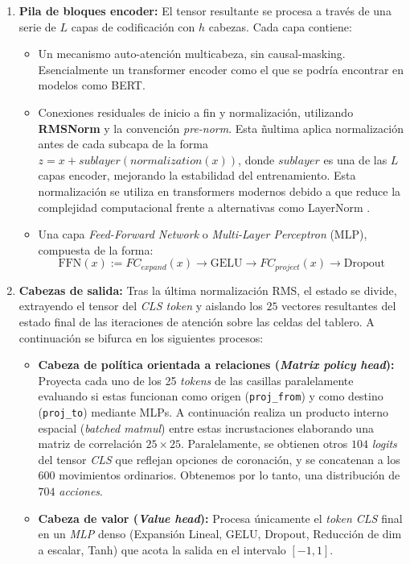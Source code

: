\documentclass[12pt, a4paper]{article}
\let\cite\supercite
\begin{document}
\begin{enumerate}
    \item \textbf{Pila de bloques encoder:} El tensor resultante se procesa a través de una serie de $L$ capas de codificación con $h$ cabezas. Cada capa contiene:
    \begin{itemize}
        \item Un mecanismo auto-atención multicabeza, sin causal-masking. Esencialmente un transformer encoder como el que se podría encontrar en modelos como BERT.
        
        \item Conexiones residuales de inicio a fin y normalización, utilizando \textbf{RMSNorm} y la convención \textit{pre-norm}. Esta ñultima aplica normalización antes de cada subcapa de la forma $z = x + sublayer(normalization(x))$, donde $sublayer$ es una de las $L$ capas encoder, mejorando la estabilidad del entrenamiento\cite{DBLP:journals/corr/abs-2002-04745}. Esta normalización se utiliza en transformers modernos debido a que reduce la complejidad computacional frente a alternativas como LayerNorm \cite{gupta2025geometricinterpretationlayernormalization}.
        
        \item Una capa \textit{Feed-Forward Network} o \textit{Multi-Layer Perceptron} (MLP), compuesta de la forma:
        $$\text{FFN}(x) := FC_{expand}(x) \rightarrow \text{GELU} \rightarrow FC_{project}(x) \rightarrow \text{Dropout}$$
    \end{itemize}

    \item \textbf{Cabezas de salida:} Tras la última normalización RMS, el estado se divide, extrayendo el tensor del \textit{CLS token} y aislando los $25$ vectores resultantes del estado final de las iteraciones de atención sobre las celdas del tablero. A continuación se bifurca en los siguientes procesos:
    \begin{itemize}
        \item \textbf{Cabeza de política orientada a relaciones (\textit{Matrix policy head}):} Proyecta cada uno de los 25 \textit{tokens} de las casillas paralelamente evaluando si estas funcionan como origen (\texttt{proj\_from}) y como destino (\texttt{proj\_to}) mediante MLPs. A continuación realiza un producto interno espacial (\textit{batched matmul}) entre estas incrustaciones elaborando una matriz de correlación $25 \times 25$. Paralelamente, se obtienen otros $104$ \textit{logits} del tensor \textit{CLS} que reflejan opciones de coronación, y se concatenan a los $600$ movimientos ordinarios. Obtenemos por lo tanto, una distribución de $704$ \textit{acciones}.
        \item \textbf{Cabeza de valor (\textit{Value head}):} Procesa únicamente el \textit{token CLS} final en un \textit{MLP} denso (Expansión Lineal, GELU, Dropout, Reducción de dim a escalar, Tanh) que acota la salida en el intervalo $[-1, 1]$.


\end{itemize}
\end{enumerate}
\end{document}
